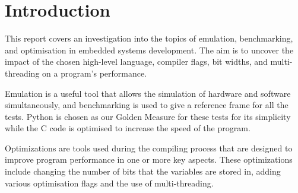\section{Introduction}
This report covers an investigation into the topics of emulation, benchmarking, and optimisation in embedded systems development.
The aim is to uncover the impact of the chosen high-level language, compiler flags, bit widths, and multi-threading on a program's performance.

Emulation is a useful tool that allows the simulation of hardware and software simultaneously,
and benchmarking is used to give a reference frame for all the tests.
Python is chosen as our Golden Measure for these tests for its simplicity while the C code is optimised to increase the speed of the program.

Optimizations are tools used during the compiling process that are designed to improve program performance in one or more key aspects.
These optimizations include changing the number of bits that the variables are stored in, adding various optimisation flags and the use of multi-threading.
